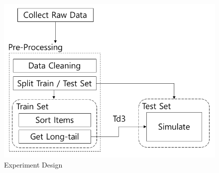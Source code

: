 \documentclass[sigconf,anonymous=true]{acmart}
\begin{document}
\begin{figure}[H]
    \centering
    \includegraphics[width=0.85\columnwidth]{figs/figure_design.png}
    \caption{Experiment Design}
    \label{fig:my_label}
\end{figure}
\end{document}
